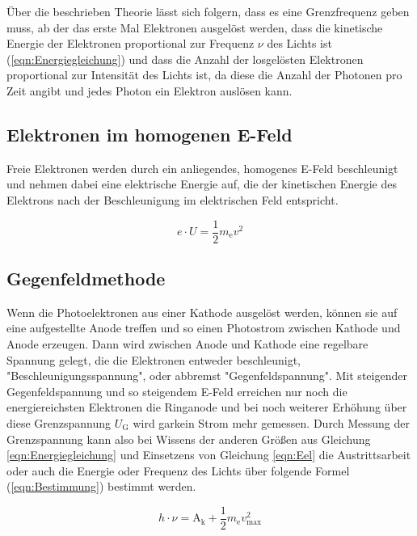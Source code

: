 \documentclass[titlepage = firstcover]{scrartcl}
\begin{document}
        \FloatBarrier

        \noindent
        Über die beschrieben Theorie lässt sich folgern, dass es eine Grenzfrequenz geben muss, ab der das erste Mal Elektronen ausgelöst werden, dass die kinetische Energie der Elektronen
        proportional zur Frequenz $\nu$ des Lichts ist (\ref{eqn:Energiegleichung}) und dass die Anzahl der losgelösten Elektronen proportional zur Intensität des Lichts ist, da diese die Anzahl der 
        Photonen pro Zeit angibt und jedes Photon ein Elektron auslösen kann.

        \subsection{Elektronen im homogenen E-Feld}
        Freie Elektronen werden durch ein anliegendes, homogenes E-Feld beschleunigt und nehmen dabei eine elektrische Energie auf, die der kinetischen Energie des Elektrons nach der Beschleunigung
        im elektrischen Feld entspricht.

        \begin{equation}
            e \cdot U = \frac{1}{2} m_{\text{e}}v^2
            \label{eqn:Eel}
        \end{equation}

        \subsection{Gegenfeldmethode}
        Wenn die Photoelektronen aus einer Kathode ausgelöst werden, können sie auf eine aufgestellte Anode treffen und so einen Photostrom zwischen Kathode und Anode erzeugen. Dann wird zwischen
        Anode und Kathode eine regelbare Spannung gelegt, die die Elektronen entweder beschleunigt, "Beschleunigungsspannung", oder abbremst "Gegenfeldspannung". Mit steigender Gegenfeldspannung und 
        so steigendem E-Feld erreichen nur noch die energiereichsten Elektronen die Ringanode und bei noch weiterer Erhöhung über diese Grenzspannung $U_{\text{G}}$ wird garkein Strom mehr gemessen. 
        Durch Messung der Grenzspannung kann also bei Wissens der anderen Größen aus Gleichung \ref{eqn:Energiegleichung} und Einsetzens von Gleichung \ref{eqn:Eel} die Austrittsarbeit oder auch die 
        Energie oder Frequenz des Lichts über folgende Formel (\ref{eqn:Bestimmung}) bestimmt werden.

        \begin{equation}
          h \cdot \nu = \text{A}_{\text{k}} + \frac{1}{2} m_{\text{e}}v_{\text{max}}^2
          \label{eqn:Bestimmung}
        \end{equation}
        
\end{document}

